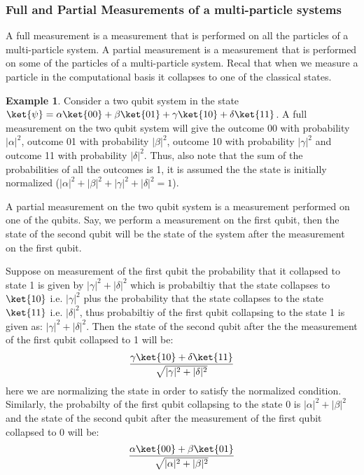 \documentclass[12pt, oneside]{book}
\theoremstyle{definition}
\theoremstyle{definition}
\newtheorem{example}{Example}[section]
\theoremstyle{remark}
\begin{document}
\subsubsection{Full and Partial Measurements of a multi-particle systems}
A full measurement is a measurement that is performed on all the particles of a multi-particle system.
A partial measurement is a measurement that is performed on some of the particles of a multi-particle system.
Recal that when we measure a particle in the computational basis it collapses to one of the classical states.
\begin{example}
    Consider a two qubit system in the state $\ket{\psi}=\alpha\ket{00}+\beta\ket{01}+\gamma\ket{10}+\delta\ket{11}$.
    A full measurement on the two qubit system will give the outcome 00 with probability $|\alpha|^2$, outcome 01 with probability $|\beta|^2$, outcome 10 with probability $|\gamma|^2$ and outcome 11 with probability $|\delta|^2$. Thus, also note that 
    the sum of the probabilities of all the outcomes is 1, it is assumed the the state is initially normalized ($|\alpha|^2+|\beta|^2+|\gamma|^2+|\delta|^2=1$).
    
    A partial measurement on the two qubit system is a measurement performed on one of the qubits. Say, we perform a measurement on the first qubit, then the state of the second qubit will be the state of the system after the measurement on the first qubit.
    
    Suppose on measurement of the first qubit the probability that it collapsed to state 1 is given by $|\gamma|^2+|\delta|^2$ which is probabiltiy that the state collapses to $\ket{10}$ i.e. $|\gamma|^2$ plus the probability that the state collapses to the state
    $\ket{11}$ i.e. $|\delta|^2$, thus probabiltiy of the first qubit collapsing to the state 1 is given as: $|\gamma|^2 + |\delta|^2$. Then the state of the second qubit after the the measurement of the first qubit collapsed to 1 will be:
    \[
        \dfrac{\gamma\ket{10}+\delta\ket{11}}{\sqrt{|\gamma|^2+|\delta|^2}}
    \]
    here we are normalizing the state in order to satisfy the normalized condition.
    Similarly, the probabilty of the first qubit collapsing to the state 0 is $|\alpha|^2+|\beta|^2$ and the state of the second qubit after the measurement of the first qubit collapsed to 0 will be:
    \[
        \dfrac{\alpha\ket{00}+\beta\ket{01}}{\sqrt{|\alpha|^2+|\beta|^2}}
    \]
\end{example}
\end{document}
